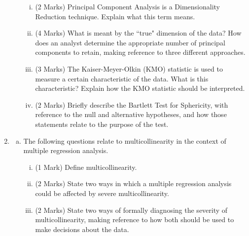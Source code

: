 \documentclass[a4paper,12pt]{article}
\begin{document}
\begin{enumerate}
\begin{enumerate}[(a)]
\begin{enumerate}[(i)]
	\item (2 Marks) Principal Component Analysis is a Dimensionality Reduction technique. Explain what this term means.
	\item (4 Marks)	What is meant by the ``true" dimension of the data?  How does an analyst determine the appropriate number of principal components to retain, making reference to three different approaches.
	\item (3 Marks) The Kaiser-Meyer-Olkin (KMO) statistic is used to measure a certain characteristic of the data. What is this characteristic? Explain how the KMO statistic should be interpreted.
	\item (2 Marks) Briefly describe the Bartlett Test for Sphericity, with reference to the null and alternative hypotheses, and how those statements relate to the purpose of the test.
\end{enumerate} 




\end{enumerate}

\item 
\begin{enumerate}[(a)]
\item The following questions relate to multicollinearity in the context of multiple
regression analysis.
\begin{enumerate}[(i)]
	\item (1 Mark) Define multicollinearity.
	\item (2 Marks) State two ways in which a multiple regression analysis could be affected by severe
	multicollinearity.
	\item (2 Marks) State two ways of formally diagnosing the severity of multicollinearity, making reference to how both should be used to make decisions about the data.
\end{enumerate}



\end{enumerate}
\end{enumerate}
\end{document}
